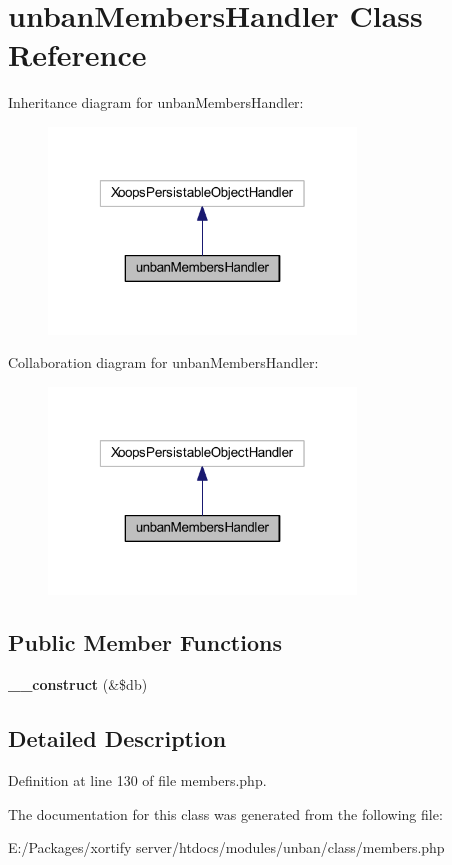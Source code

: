 \hypertarget{classunban_members_handler}{\section{unban\-Members\-Handler Class Reference}
\label{classunban_members_handler}
}


Inheritance diagram for unban\-Members\-Handler\-:
\nopagebreak
\begin{figure}[H]
\begin{center}
\leavevmode
\includegraphics[width=232pt]{classunban_members_handler__inherit__graph}
\end{center}
\end{figure}


Collaboration diagram for unban\-Members\-Handler\-:
\nopagebreak
\begin{figure}[H]
\begin{center}
\leavevmode
\includegraphics[width=232pt]{classunban_members_handler__coll__graph}
\end{center}
\end{figure}
\subsection*{Public Member Functions}
\begin{DoxyCompactItemize}
\item 
\hypertarget{classunban_members_handler_aaf2ef772755ec6f361d44e16cc9ffd69}{{\bfseries \-\_\-\-\_\-construct} (\&\$db)}\label{classunban_members_handler_aaf2ef772755ec6f361d44e16cc9ffd69}

\end{DoxyCompactItemize}


\subsection{Detailed Description}


Definition at line 130 of file members.\-php.



The documentation for this class was generated from the following file\-:\begin{DoxyCompactItemize}
\item 
E\-:/\-Packages/xortify server/htdocs/modules/unban/class/members.\-php\end{DoxyCompactItemize}
